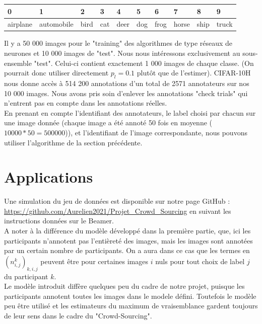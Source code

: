 \documentclass[frenchb]{report}
\newcommand{\1}{\mathbbm{1}}
\theoremstyle{definition}\newtheorem{defn}{Définition}
\theoremstyle{definition}\newtheorem{exm}{Exemple}
\theoremstyle{definition}\newtheorem{nota}{Notation}
\theoremstyle{definition}\newtheorem{rem}{Remarque}
\begin{document}
\begin{table}[!ht]
    \centering
    \begin{tabular}{|l|l|l|l|l|l|l|l|l|l|}
    \hline
        0 & 1 & 2 & 3 & 4 & 5 & 6 & 7 & 8 & 9 \\ \hline
        airplane & automobile & bird & cat & deer & dog & frog & horse & ship & truck \\ \hline
    \end{tabular}
\end{table}

Il y a 50 000 images pour le "training" des algorithmes de type réseaux de neurones et 10 000 images de "test". Nous nous intéressons exclusivement au sous-ensemble "test". Celui-ci contient exactement 1 000 images de chaque classe. (On pourrait donc utiliser directement $p_l = 0.1$ plutôt que de l'estimer). CIFAR-10H nous donne accès à 514 200 annotations d'un total de 2571 annotateurs sur nos 10 000 images. Nous avons pris soin d'enlever les annotations "check trials" qui n'entrent pas en compte dans les annotations réelles.\\

En prenant en compte l'identifiant des annotateurs, le label choisi par chacun sur une image donnée (chaque image a été annoté 50 fois en moyenne ($10 000*50 = 500 000$)), et l'identifiant de l'image correspondante, nous pouvons utiliser l'algorithme de la section précédente.

\section{Applications}

Une simulation du jeu de données est disponible sur notre page GitHub : \url{https://github.com/Aurelien2021/Projet_Crowd_Sourcing} en suivant les instructions données sur le Beamer.\\

A noter à la différence du modèle développé dans la première partie, que, ici les participants n'annotent pas l'entièreté des images, mais les images sont annotées par un certain nombre de participants. On a aura dans ce cas que les termes en $(n^k_{i,j})_{k,i,j}$ peuvent être pour certaines images $i$ nuls pour tout choix de label $j$ du participant $k$. \\

Le modèle introduit diffère quelques peu du cadre de notre projet, puisque les participants annotent toutes les images dans le modele défini. Toutefois le modèle peu être utilisé et les estimateurs du maximum de vraisemblance gardent toujours de leur sens dans le cadre du "Crowd-Sourcing".\\
\end{document}
